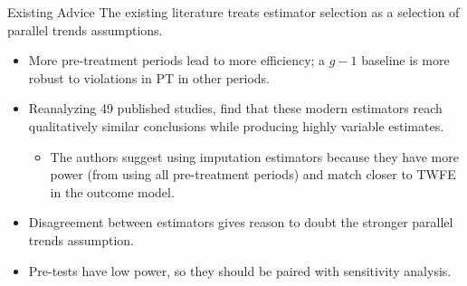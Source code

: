 \documentclass[11pt]{beamer}
\begin{document}
\begin{frame}{Existing Advice}
         The existing literature treats estimator selection as a selection of parallel trends assumptions.
         
         \vspace{5mm}

         \begin{itemize}
             \item More pre-treatment periods lead to more efficiency; a $g-1$ baseline is more robust to violations in PT in other periods. \parencite{roth2023s, callaway2023difference}
             \item Reanalyzing 49 published studies, \textcite{chiu2026causal} find that these modern estimators reach qualitatively similar conclusions while producing highly variable estimates. 
             \begin{itemize}
                 \item The authors suggest using imputation estimators because they have more power (from using all pre-treatment periods) and match closer to TWFE in the outcome model.
             \end{itemize}
             \item Disagreement between estimators gives reason to doubt the stronger parallel trends assumption. \parencite{marcus2021role, chen2025efficient}
             \item Pre-tests have low power, so they should be paired with sensitivity analysis. \parencite{roth2022pretest, rambachan2023more, liu2025cohort} 
         \end{itemize}
\end{frame}
\end{document}
